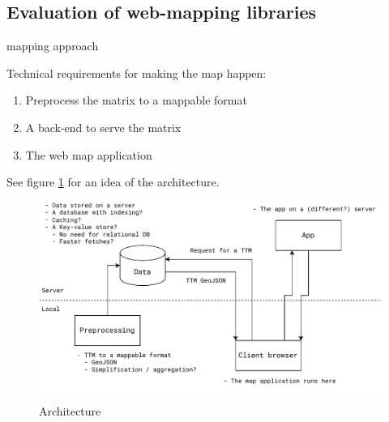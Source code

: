 \subsection{Evaluation of web-mapping libraries}
mapping approach

Technical requirements for making the map happen:
\begin{enumerate}
	\item Preprocess the matrix to a mappable format
	\item A back-end to serve the matrix
	\item The web map application
\end{enumerate}

See figure \ref{fig:architechture} for an idea of the architecture.

\begin{figure}[H]
	\centering
	\includegraphics[width=1\textwidth]{images/architechture}
	\caption{Architecture}
	\label{fig:architechture}
\end{figure}




